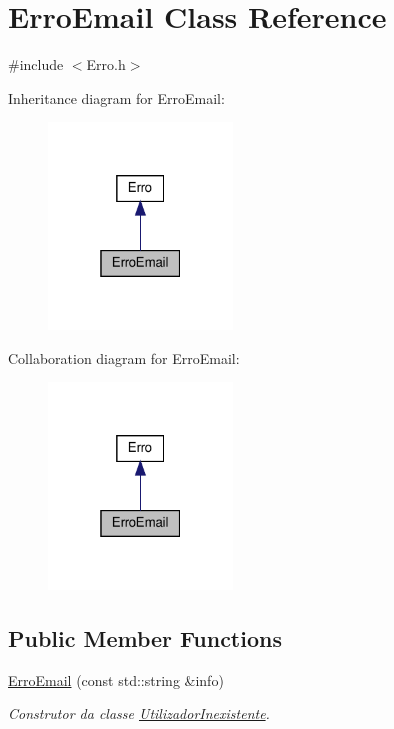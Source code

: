 \hypertarget{classErroEmail}{}\section{Erro\+Email Class Reference}
\label{classErroEmail}


{\ttfamily \#include $<$Erro.\+h$>$}



Inheritance diagram for Erro\+Email\+:
\nopagebreak
\begin{figure}[H]
\begin{center}
\leavevmode
\includegraphics[width=139pt]{classErroEmail__inherit__graph}
\end{center}
\end{figure}


Collaboration diagram for Erro\+Email\+:
\nopagebreak
\begin{figure}[H]
\begin{center}
\leavevmode
\includegraphics[width=139pt]{classErroEmail__coll__graph}
\end{center}
\end{figure}
\subsection*{Public Member Functions}
\begin{DoxyCompactItemize}
\item 
\hyperlink{classErroEmail_a536520637b17434e8fd8ab296db9e026}{Erro\+Email} (const std\+::string \&info)
\begin{DoxyCompactList}\small\item\em Construtor da classe \hyperlink{classUtilizadorInexistente}{Utilizador\+Inexistente}. \end{DoxyCompactList}\end{DoxyCompactItemize}


